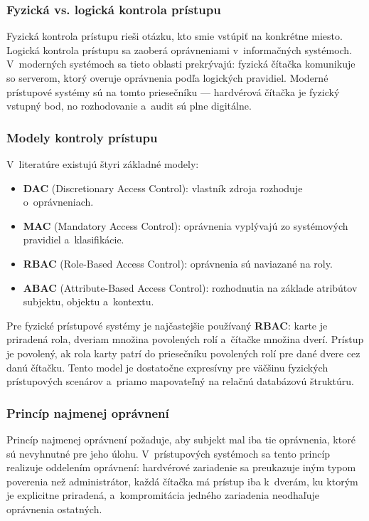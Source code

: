 \subsubsection{Fyzická vs. logická kontrola prístupu}

Fyzická kontrola prístupu rieši otázku, kto smie vstúpiť na konkrétne miesto. Logická kontrola prístupu sa zaoberá oprávneniami v~informačných systémoch. V~moderných systémoch sa tieto oblasti prekrývajú: fyzická čítačka komunikuje so serverom, ktorý overuje oprávnenia podľa logických pravidiel. Moderné prístupové systémy sú na tomto priesečníku --- hardvérová čítačka je fyzický vstupný bod, no rozhodovanie a~audit sú plne digitálne.

\subsubsection{Modely kontroly prístupu}

V~literatúre existujú štyri základné modely:
\begin{itemize}[leftmargin=*,itemsep=2pt]
  \item \textbf{DAC} (Discretionary Access Control): vlastník zdroja rozhoduje o~oprávneniach.
  \item \textbf{MAC} (Mandatory Access Control): oprávnenia vyplývajú zo systémových pravidiel a~klasifikácie.
  \item \textbf{RBAC} (Role-Based Access Control): oprávnenia sú naviazané na roly\cite{SaltzerSchroeder1975}.
  \item \textbf{ABAC} (Attribute-Based Access Control): rozhodnutia na základe atribútov subjektu, objektu a~kontextu.
\end{itemize}

Pre fyzické prístupové systémy je najčastejšie používaný \textbf{RBAC}: karte je priradená rola, dveriam množina povolených rolí a~čítačke množina dverí. Prístup je povolený, ak rola karty patrí do priesečníku povolených rolí pre dané dvere cez danú čítačku. Tento model je dostatočne expresívny pre väčšinu fyzických prístupových scenárov a~priamo mapovateľný na relačnú databázovú štruktúru\cite{NIST80053}.

\subsubsection{Princíp najmenej oprávnení}

Princíp najmenej oprávnení\cite{SaltzerSchroeder1975} požaduje, aby subjekt mal iba tie oprávnenia, ktoré sú nevyhnutné pre jeho úlohu. V~prístupových systémoch sa tento princíp realizuje oddelením oprávnení: hardvérové zariadenie sa preukazuje iným typom poverenia než administrátor, každá čítačka má prístup iba k~dverám, ku ktorým je explicitne priradená, a~kompromitácia jedného zariadenia neodhaľuje oprávnenia ostatných.

